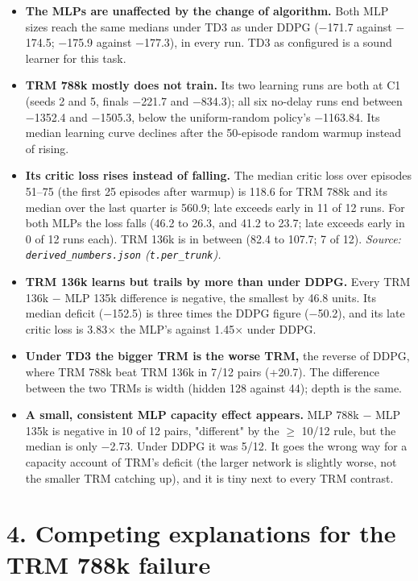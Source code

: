 \documentclass[11pt]{article}
\begin{document}
\begin{itemize}
\item \textbf{The MLPs are unaffected by the change of algorithm.} Both MLP sizes reach the same medians under TD3 as under DDPG ($-$171.7 against $-$174.5; $-$175.9 against $-$177.3), in every run. TD3 as configured is a sound learner for this task.
\item \textbf{TRM 788k mostly does not train.} Its two learning runs are both at C1 (seeds 2 and 5, finals $-$221.7 and $-$834.3); all six no-delay runs end between $-$1352.4 and $-$1505.3, below the uniform-random policy's $-$1163.84. Its median learning curve declines after the 50-episode random warmup instead of rising.
\item \textbf{Its critic loss rises instead of falling.} The median critic loss over episodes 51--75 (the first 25 episodes after warmup) is 118.6 for TRM 788k and its median over the last quarter is 560.9; late exceeds early in 11 of 12 runs. For both MLPs the loss falls (46.2 to 26.3, and 41.2 to 23.7; late exceeds early in 0 of 12 runs each). TRM 136k is in between (82.4 to 107.7; 7 of 12). \emph{Source: \texttt{derived\_\allowbreak{}numbers.\allowbreak{}json} (\texttt{t.per\_trunk}).}
\item \textbf{TRM 136k learns but trails by more than under DDPG.} Every TRM 136k $-$ MLP 135k difference is negative, the smallest by 46.8 units. Its median deficit ($-$152.5) is three times the DDPG figure ($-$50.2), and its late critic loss is 3.83$\times$ the MLP's against 1.45$\times$ under DDPG.
\item \textbf{Under TD3 the bigger TRM is the worse TRM,} the reverse of DDPG, where TRM 788k beat TRM 136k in 7/12 pairs (+20.7). The difference between the two TRMs is width (hidden 128 against 44); depth is the same.
\item \textbf{A small, consistent MLP capacity effect appears.} MLP 788k $-$ MLP 135k is negative in 10 of 12 pairs, "different" by the $\geq$ 10/12 rule, but the median is only $-$2.73. Under DDPG it was 5/12. It goes the wrong way for a capacity account of TRM's deficit (the larger network is slightly worse, not the smaller TRM catching up), and it is tiny next to every TRM contrast.
\end{itemize}



\section*{4. Competing explanations for the TRM 788k failure}
\end{document}
